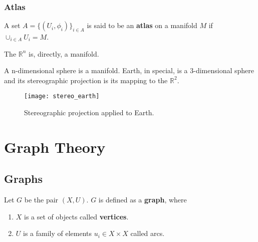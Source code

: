\subsubsection{Atlas}

A set $A = \{(U_i, \phi_i)\}_{i \in A}$ is said to be an \textbf{atlas} on a manifold $M$ if $\cup_{i \in A} U_i = M$. \cite{lee2002}

\begin{example}
	The $\mathbb{R}^n$ is, directly, a manifold.
\end{example}

\begin{example}
	A n-dimensional sphere is a manifold. Earth, in special, is a 3-dimensional sphere and its stereographic projection is its mapping to the $\mathbb{R}^2$. \cite{stereo_proj}

	\begin{figure}[H]
		\centering
		\captionsetup{justification=centering}

		\texttt{[image: stereo\_earth]}
		\caption{Stereographic projection applied to Earth.}
		\label{fig:stereographic_earth}
	\end{figure}
\end{example}

\section{Graph Theory}
\subsection{Graphs}

Let $G$ be the pair $(X, U)$. $G$ is defined as a \textbf{graph}, \cite{berge1973} where
\begin{enumerate}
	\item $X$ is a set of objects called \textbf{vertices}.
	\item $U$ is a family of elements $u_i \in X\times X$ called arcs.
\end{enumerate}

